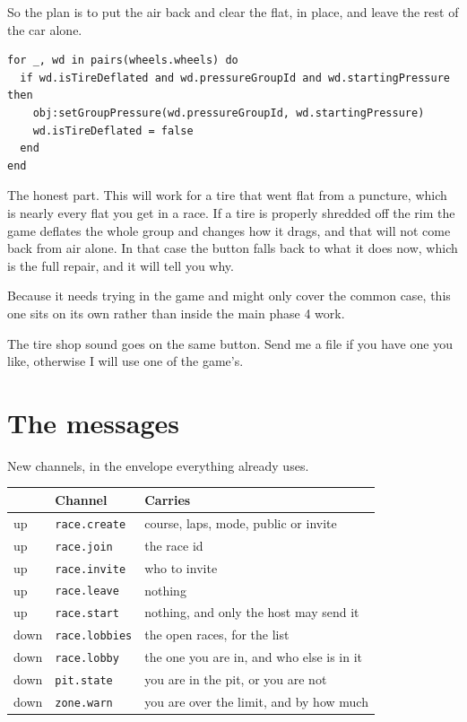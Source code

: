 \documentclass[11pt,a4paper]{article}
\newcommand{\code}[1]{\texttt{\small #1}}
\begin{document}
So the plan is to put the air back and clear the flat, in place, and leave the
rest of the car alone.

\begin{lstlisting}
for _, wd in pairs(wheels.wheels) do
  if wd.isTireDeflated and wd.pressureGroupId and wd.startingPressure then
    obj:setGroupPressure(wd.pressureGroupId, wd.startingPressure)
    wd.isTireDeflated = false
  end
end
\end{lstlisting}

The honest part. This will work for a tire that went flat from a puncture,
which is nearly every flat you get in a race. If a tire is properly shredded
off the rim the game deflates the whole group and changes how it drags, and
that will not come back from air alone. In that case the button falls back to
what it does now, which is the full repair, and it will tell you why.

Because it needs trying in the game and might only cover the common case, this
one sits on its own rather than inside the main phase 4 work.

The tire shop sound goes on the same button. Send me a file if you have one you
like, otherwise I will use one of the game's.

\section{The messages}

New channels, in the envelope everything already uses.

\begin{longtable}{@{}p{20mm}p{34mm}>{\raggedright\arraybackslash}p{100mm}@{}}
\toprule
& \textbf{Channel} & \textbf{Carries} \\
\midrule
\endhead
up   & \code{race.create}  & course, laps, mode, public or invite \\
up   & \code{race.join}    & the race id \\
up   & \code{race.invite}  & who to invite \\
up   & \code{race.leave}   & nothing \\
up   & \code{race.start}   & nothing, and only the host may send it \\
down & \code{race.lobbies} & the open races, for the list \\
down & \code{race.lobby}   & the one you are in, and who else is in it \\
down & \code{pit.state}    & you are in the pit, or you are not \\
down & \code{zone.warn}    & you are over the limit, and by how much \\
\bottomrule
\end{longtable}
\end{document}
